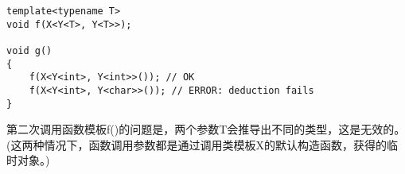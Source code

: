 \begin{lstlisting}[style=styleCXX]
template<typename T>
void f(X<Y<T>, Y<T>>);

void g()
{
	f(X<Y<int>, Y<int>>()); // OK
	f(X<Y<int>, Y<char>>()); // ERROR: deduction fails
}
\end{lstlisting}

第二次调用函数模板f()的问题是，两个参数T会推导出不同的类型，这是无效的。(这两种情况下，函数调用参数都是通过调用类模板X的默认构造函数，获得的临时对象。)
































